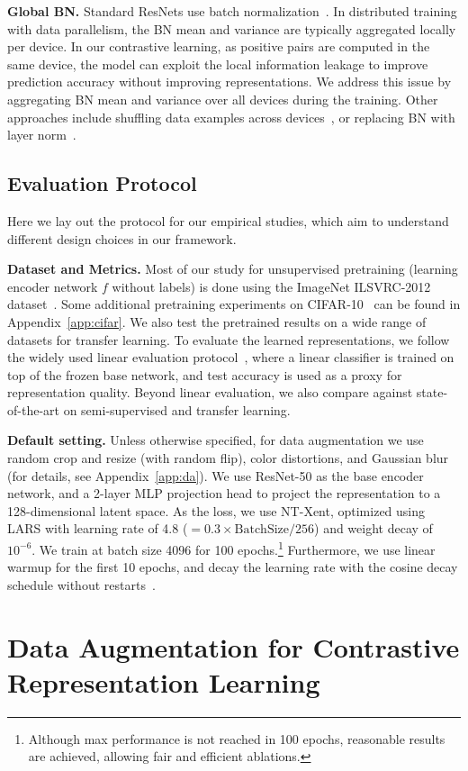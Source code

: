 \documentclass{article}
\begin{document}
\textbf{Global BN.} 
Standard ResNets use batch normalization~\cite{ioffe2015batch}. In distributed training with data parallelism, the BN mean and variance are typically aggregated locally per device. In our contrastive learning, as positive pairs are computed in the same device, the model can exploit the local information leakage to improve prediction accuracy without improving representations. We address this issue by aggregating BN mean and variance over all devices during the training. 
Other approaches include shuffling data examples across devices~\cite{he2019momentum}, or replacing BN with layer norm~\cite{henaff2019data}.

\subsection{Evaluation Protocol}
Here we lay out the protocol for our empirical studies, which aim to understand different design choices in our framework.

\textbf{Dataset and Metrics.} Most of our study for unsupervised pretraining (learning encoder network $f$ without labels) is done using the ImageNet ILSVRC-2012 dataset~\cite{russakovsky2015imagenet}. Some additional pretraining experiments on CIFAR-10~\cite{krizhevsky2009learning} can be found in Appendix~\ref{app:cifar}. We also test the pretrained results on a wide range of datasets for transfer learning.
To evaluate the learned representations, we follow the widely used linear evaluation protocol~\cite{zhang2016colorful,oord2018representation,bachman2019learning,kolesnikov2019revisiting}, where a linear classifier is trained on top of the frozen base network, and test accuracy is used as a proxy for representation quality. Beyond linear evaluation, we also compare against state-of-the-art on semi-supervised and transfer learning.

\textbf{Default setting.} Unless otherwise specified, for data augmentation we use random crop and resize (with random flip), color distortions, and Gaussian blur (for details, see Appendix~\ref{app:da}). We use ResNet-50 as the base encoder network, and a 2-layer MLP projection head to project the representation to a 128-dimensional latent space. As the loss, we use NT-Xent, optimized using LARS with learning rate of 4.8 ($=0.3\times\mathrm{BatchSize}/256$) and weight decay of $10^{-6}$. We train at batch size 4096 for 100 epochs.\footnote{Although max performance is not reached in 100 epochs, reasonable results are achieved, allowing fair and efficient ablations.} Furthermore, we use linear warmup for the first 10 epochs, and decay the learning rate with the cosine decay schedule without restarts~\cite{loshchilov2016sgdr}. \section{Data Augmentation for Contrastive Representation Learning}
\label{sec:da}
\end{document}
